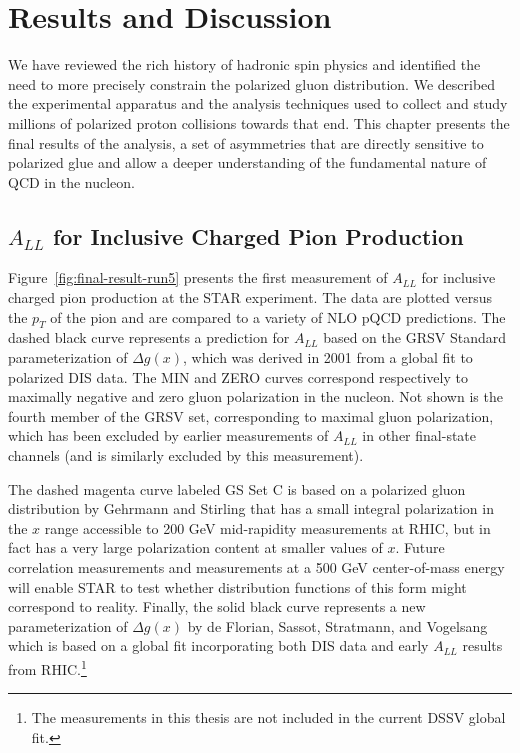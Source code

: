 \chapter{Results and Discussion}

We have reviewed the rich history of hadronic spin physics and
identified the need to more precisely constrain the polarized gluon
distribution. We described the experimental apparatus and the analysis
techniques used to collect and study millions of polarized proton collisions
towards that end. This chapter presents the final results of the analysis, a set
of asymmetries that are directly sensitive to polarized glue and allow a deeper
understanding of the fundamental nature of QCD in the nucleon.

\section{$A_{LL}$ for Inclusive Charged Pion Production}

Figure~\ref{fig:final-result-run5} presents the first measurement of \(A_{LL}\)
for inclusive charged pion production at the STAR experiment. The data are
plotted versus the \(p_T\) of the pion and are compared to a variety of NLO pQCD
predictions. The dashed black curve represents a prediction for \(A_{LL}\) based
on the GRSV Standard parameterization of \(\Delta g(x)\), which was derived in
2001 from a global fit to polarized DIS data. The MIN and ZERO curves correspond
respectively to maximally negative and zero gluon polarization in the nucleon.
Not shown is the fourth member of the GRSV set, corresponding to maximal gluon
polarization, which has been excluded by earlier measurements of \(A_{LL}\) in
other final-state channels (and is similarly excluded by this measurement).

The dashed magenta curve labeled GS Set C is based on a polarized gluon
distribution by Gehrmann and Stirling that has a small integral polarization in
the \(x\) range accessible to 200 GeV mid-rapidity measurements at RHIC, but in
fact has a very large polarization content at smaller values of \(x\). Future
correlation measurements and measurements at a 500 GeV center-of-mass energy
will enable STAR to test whether distribution functions of this form might
correspond to reality. Finally, the solid black curve represents a new
parameterization of \(\Delta g(x)\) by de Florian, Sassot, Stratmann, and
Vogelsang which is based on a global fit incorporating both DIS data and early
\(A_{LL}\) results from RHIC.\footnote{The measurements in this thesis are not
included in the current DSSV global fit.}

